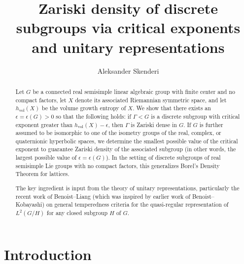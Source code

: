 \documentclass[psamsfonts]{amsart}
\title[Zariski density, critical exponents, and unitary representations]{Zariski density of discrete subgroups via critical exponents and unitary representations}
\author{Aleksander Skenderi}
\theoremstyle{definition}
\theoremstyle{remark}
\numberwithin{equation}{section}
\begin{document}
\begin{abstract}
Let $G$ be a connected real semisimple linear algebraic group with finite center and no compact factors, let $X$ denote its associated Riemannian symmetric space, and let $h_{\mathrm{vol}}(X)$ be the volume growth entropy of $X$. We show that there exists an $\epsilon = \epsilon(G) > 0$ so that the following holds: if $\Gamma < G$ is a discrete subgroup with critical exponent greater than $h_{\mathrm{vol}}(X) - \epsilon$, then $\Gamma$ is Zariski dense in $G$. If $G$ is further assumed to be isomorphic to one of the isometry groups of the real, complex, or quaternionic hyperbolic spaces, we determine the smallest possible value of the critical exponent to guarantee Zariski density of the associated subgroup (in other words, the largest possible value of $\epsilon = \epsilon(G)$). In the setting of discrete subgroups of real semisimple Lie groups with no compact factors, this generalizes Borel's Density Theorem for lattices.
\par 
The key ingredient is input from the theory of unitary representations, particularly the recent work of Benoist--Liang (which was inspired by earlier work of Benoist--Kobayashi) on general temperedness criteria for the quasi-regular representation of $L^2(G/H)$ for any closed subgroup $H$ of $G$.
\end{abstract}
\maketitle
\tableofcontents
\section{Introduction}
\end{document}
